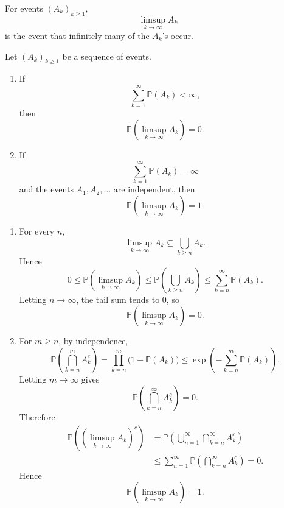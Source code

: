 \begin{remark}
    For events $(A_k)_{k\ge1}$,
    \[
        \limsup_{k\to\infty}A_k
    \]
    is the event that infinitely many of the $A_k$'s occur.
\end{remark}

\begin{propositionenv}
    Let $(A_k)_{k\ge 1}$ be a sequence of events.

    \begin{enumerate}[label=(\arabic*)]
        \item If
        \[
            \sum_{k=1}^{\infty}\mathbb{P}(A_k)<\infty,
        \]
        then
        \[
            \mathbb{P}\left(
                \limsup_{k\to\infty}A_k
            \right)=0.
        \]

        \item If
        \[
            \sum_{k=1}^{\infty}\mathbb{P}(A_k)=\infty
        \]
        and the events $A_1,A_2,\ldots$ are independent, then
        \[
            \mathbb{P}\left(
                \limsup_{k\to\infty}A_k
            \right)=1.
        \]
    \end{enumerate}
\end{propositionenv}

\begin{proofenv}
    \begin{enumerate}[label=(\arabic*)]
        \item For every $n$,
        \[
            \limsup_{k\to\infty}A_k
            \subseteq
            \bigcup_{k\ge n}A_k.
        \]
        Hence
        \[
            0
            \le
            \mathbb{P}\left(\limsup_{k\to\infty}A_k\right)
            \le
            \mathbb{P}\left(\bigcup_{k\ge n}A_k\right)
            \le
            \sum_{k=n}^{\infty}\mathbb{P}(A_k).
        \]
        Letting $n\to\infty$, the tail sum tends to $0$, so
        \[
            \mathbb{P}\left(\limsup_{k\to\infty}A_k\right)=0.
        \]

        \item For $m\ge n$, by independence,
        \[
            \mathbb{P}\left(\bigcap_{k=n}^{m}A_k^c\right)
            =
            \prod_{k=n}^{m}\bigl(1-\mathbb{P}(A_k)\bigr)
            \le
            \exp\left(
                -\sum_{k=n}^{m}\mathbb{P}(A_k)
            \right).
        \]
        Letting $m\to\infty$ gives
        \[
            \mathbb{P}\left(\bigcap_{k=n}^{\infty}A_k^c\right)=0.
        \]
        Therefore
        \[
        \begin{aligned}
            \mathbb{P}\left(
                \left(\limsup_{k\to\infty}A_k\right)^c
            \right)
            &=
            \mathbb{P}\left(
                \bigcup_{n=1}^{\infty}
                \bigcap_{k=n}^{\infty}A_k^c
            \right) \\
            &\le
            \sum_{n=1}^{\infty}
            \mathbb{P}\left(
                \bigcap_{k=n}^{\infty}A_k^c
            \right)
            =0.
        \end{aligned}
        \]
        Hence
        \[
            \mathbb{P}\left(\limsup_{k\to\infty}A_k\right)=1.
        \]
    \end{enumerate}
\end{proofenv}

